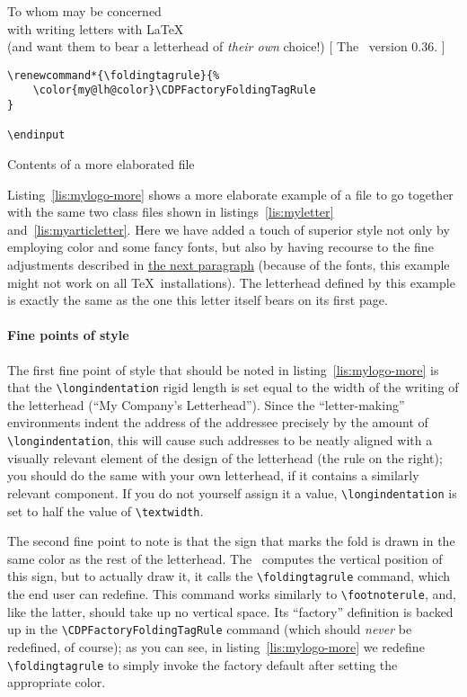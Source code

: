 \begin{letterhead}{
	To whom may be concerned\\
	with writing letters with \LaTeX\\
	(and want them to bear a letterhead
	of \emph{their own} choice!)
}[
	The \Bundle\ version 0.36.
]
\begin{listing}[tbp]
\begin{verbatim}
\renewcommand*{\foldingtagrule}{%
    \color{my@lh@color}\CDPFactoryFoldingTagRule
}

\endinput
\end{verbatim}
	\caption{Contents of a more elaborated\/  file}
	\label{lis:mylogo-more}
	\cleanbotp
\end{listing}

Listing~\ref{lis:mylogo-more} shows a more elaborate example of a
 file to go together with the same two class files shown in
listings~\ref{lis:myletter} and~\ref{lis:myarticletter}.  Here we have added a
touch of superior style not only by employing color and some fancy fonts, but
also by having recourse to the fine adjustments described in
\hyperref[P:FinePoints]{the next paragraph} (because of the fonts, this example
might not work on all \TeX\ installations).  The letterhead defined by this
example is exactly the same as the one this letter itself bears on its first
page.



\paragraph{Fine points of style}
\label{P:FinePoints}

The first fine point of style that should be noted in
listing~\ref{lis:mylogo-more} is that the \verb|\longindentation| rigid length
is set equal to the width of the writing of the letterhead (``My Company's
Letterhead'').  Since the ``letter-making'' environments indent the address of
the addressee precisely by the amount of \verb|\longindentation|, this will
cause such addresses to be neatly aligned with a visually relevant element of
the design of the letterhead (the rule on the right); you should do the same
with your own letterhead, if it contains a similarly relevant component.  If you
do not yourself assign it a value, \verb|\longindentation| is set to half the
value of \verb|\textwidth|.

The second fine point to note is that the sign that marks the fold is drawn in
the same color as the rest of the letterhead.  The \Bundle\ computes the
vertical position of this sign, but to actually draw it, it calls the
\verb|\foldingtagrule| command, which the end user can redefine.  This command
works similarly to \verb|\footnoterule|, and, like the latter, should take up no
vertical space.  Its ``factory'' definition is backed up in the
\verb|\CDPFactoryFoldingTagRule| command (which should \emph{never} be
redefined, of course); as you can see, in listing~\ref{lis:mylogo-more} we
redefine \verb|\foldingtagrule| to simply invoke the factory default after
setting the appropriate color.


\end{letterhead}
